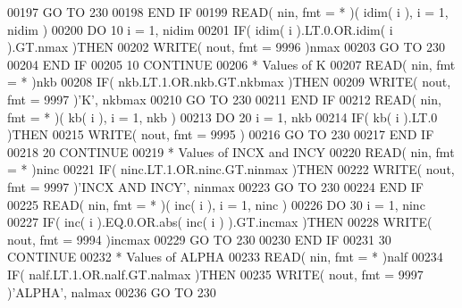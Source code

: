 \begin{DoxyCode}
00197          \textcolor{keywordflow}{GO TO} 230
00198 \textcolor{keywordflow}{      END IF}
00199       \textcolor{keyword}{READ}( nin, fmt = * )( idim( i ), i = 1, nidim )
00200       \textcolor{keywordflow}{DO} 10 i = 1, nidim
00201          \textcolor{keywordflow}{IF}( idim( i ).LT.0.OR.idim( i ).GT.nmax )\textcolor{keywordflow}{THEN}
00202             \textcolor{keyword}{WRITE}( nout, fmt = 9996 )nmax
00203             \textcolor{keywordflow}{GO TO} 230
00204 \textcolor{keywordflow}{         END IF}
00205    10 \textcolor{keywordflow}{CONTINUE}
00206 \textcolor{comment}{*     Values of K}
00207       \textcolor{keyword}{READ}( nin, fmt = * )nkb
00208       \textcolor{keywordflow}{IF}( nkb.LT.1.OR.nkb.GT.nkbmax )\textcolor{keywordflow}{THEN}
00209          \textcolor{keyword}{WRITE}( nout, fmt = 9997 )\textcolor{stringliteral}{'K'}, nkbmax
00210          \textcolor{keywordflow}{GO TO} 230
00211 \textcolor{keywordflow}{      END IF}
00212       \textcolor{keyword}{READ}( nin, fmt = * )( kb( i ), i = 1, nkb )
00213       \textcolor{keywordflow}{DO} 20 i = 1, nkb
00214          \textcolor{keywordflow}{IF}( kb( i ).LT.0 )\textcolor{keywordflow}{THEN}
00215             \textcolor{keyword}{WRITE}( nout, fmt = 9995 )
00216             \textcolor{keywordflow}{GO TO} 230
00217 \textcolor{keywordflow}{         END IF}
00218    20 \textcolor{keywordflow}{CONTINUE}
00219 \textcolor{comment}{*     Values of INCX and INCY}
00220       \textcolor{keyword}{READ}( nin, fmt = * )ninc
00221       \textcolor{keywordflow}{IF}( ninc.LT.1.OR.ninc.GT.ninmax )\textcolor{keywordflow}{THEN}
00222          \textcolor{keyword}{WRITE}( nout, fmt = 9997 )\textcolor{stringliteral}{'INCX AND INCY'}, ninmax
00223          \textcolor{keywordflow}{GO TO} 230
00224 \textcolor{keywordflow}{      END IF}
00225       \textcolor{keyword}{READ}( nin, fmt = * )( inc( i ), i = 1, ninc )
00226       \textcolor{keywordflow}{DO} 30 i = 1, ninc
00227          \textcolor{keywordflow}{IF}( inc( i ).EQ.0.OR.abs( inc( i ) ).GT.incmax )\textcolor{keywordflow}{THEN}
00228             \textcolor{keyword}{WRITE}( nout, fmt = 9994 )incmax
00229             \textcolor{keywordflow}{GO TO} 230
00230 \textcolor{keywordflow}{         END IF}
00231    30 \textcolor{keywordflow}{CONTINUE}
00232 \textcolor{comment}{*     Values of ALPHA}
00233       \textcolor{keyword}{READ}( nin, fmt = * )nalf
00234       \textcolor{keywordflow}{IF}( nalf.LT.1.OR.nalf.GT.nalmax )\textcolor{keywordflow}{THEN}
00235          \textcolor{keyword}{WRITE}( nout, fmt = 9997 )\textcolor{stringliteral}{'ALPHA'}, nalmax
00236          \textcolor{keywordflow}{GO TO} 230

\end{DoxyCode}
